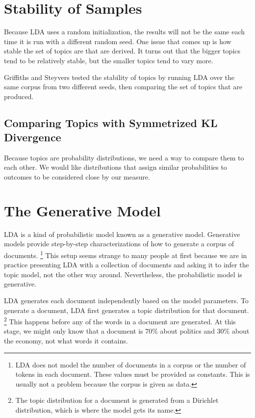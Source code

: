 \section{Stability of Samples}

Because LDA uses a random initialization, the results will not be the
same each time it is run with a different random seed.  One issue
that comes up is how stable the set of topics are that are derived.
It turns out that the bigger topics tend to be relatively stable,
but the smaller topics tend to vary more.  

Griffiths and Steyvers tested the stability of topics by running
LDA over the same corpus from two different seeds, then comparing
the set of topics that are produced.

\subsection{Comparing Topics with Symmetrized KL Divergence}

Because topics are probability distributions, we need a way to compare
them to each other.  We would like distributions that assign similar
probabilities to outcomes to be considered close by our measure.  


\section{The Generative Model}

LDA is a kind of probabilistic model known as a generative model.
Generative models provide step-by-step characterizations of how to
generate a corpus of documents.%
%
\footnote{LDA does not model the number of documents in a corpus
or the number of tokens in each document.  These values must be
provided as constants.  This is usually not a problem because
the corpus is given as data.}
%
This setup seems strange to many people at first because we are in
practice presenting LDA with a collection of documents and asking it
to infer the topic model, not the other way around.  Nevertheless, the
probabilistic model is generative.

LDA generates each document independently based on the model
parameters.  To generate a document, LDA first generates a topic
distribution for that document.%
%
\footnote{The topic distribution for a document is generated from
a Dirichlet distribution, which is where the model gets its name.}
%
This happens before any of the words in a document are generated.  At
this stage, we might only know that a document is 70\% about politics
and 30\% about the economy, not what words it contains.

